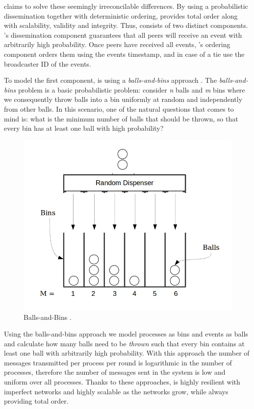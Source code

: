 \par
\epto claims to solve these seemingly irreconcilable differences. By using a probabilistic dissemination together with deterministic ordering, \epto provides total order along with scalability, validity and integrity. Thus, \epto consists of two distinct components. \epto's dissemination component guarantees that all peers will receive an event with arbitrarily high probability. Once peers have received all events, \epto's ordering component orders them using the events timestamp, and in case of a tie use the broadcaster ID of the events.
\par
To model the first component, \epto is using a \textit{balls-and-bins} approach \autocite{Koldehofe02simplegossiping}. The \textit{balls-and-bins} problem is a basic probabilistic problem: consider \textit{n} balls and \textit{m} bins where we consequently throw balls into a bin uniformly at random and independently from other balls. In this scenario, one of the natural questions that comes to mind is: what is the minimum number of balls that should be thrown, so that every bin has at least one ball with high probability?
\begin{figure}
	\includegraphics[width=\linewidth]{figures/BnB.jpeg}
	\caption{Balls-and-Bins \autocite{bnb}.}
	\label{fig:balls-and-bins}
\end{figure}
\par
Using the balls-and-bins approach we model processes as bins and events as balls and calculate how many balls need to be \textit{thrown} such that every bin contains at least one ball with arbitrarily high probability. With this approach the number of messages transmitted per process per round is logarithmic in the number of processes, therefore the number of messages sent in the system is low and uniform over all processes. Thanks to these approaches, \epto is highly resilient with  imperfect networks and highly scalable as the networks grow, while always providing total order. \par
